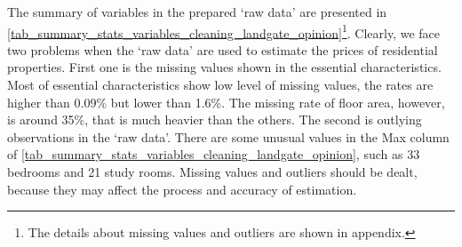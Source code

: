 %
\begin{quote}
\end{quote}
%

\noindent The summary of variables in the prepared `raw data' are presented in \autoref{tab_summary_stats_variables_cleaning_landgate_opinion}\footnote{The details about missing values and outliers are shown in appendix.}. Clearly, we face two problems when the `raw data' are used to estimate the prices of residential properties. First one is the missing values shown in the essential characteristics. Most of essential characteristics show low level of missing values, the rates are higher than 0.09\% but lower than 1.6\%. The missing rate of floor area, however, is around 35\%, that is much heavier than the others. The second is outlying observations in the `raw data'. There are some unusual values in the Max column of \autoref{tab_summary_stats_variables_cleaning_landgate_opinion}, such as 33 bedrooms and 21 study rooms. Missing values and outliers should be dealt, because they may affect the process and accuracy of estimation. 

%
\begin{quote}
\end{quote}
%